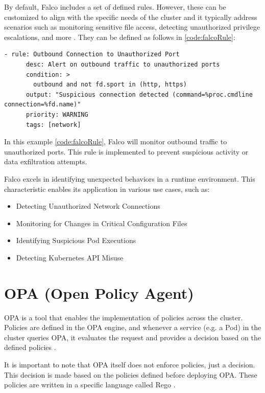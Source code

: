 \documentclass[a4paper,11pt,openright,BCOR=15mm]{scrbook}
\begin{document}
By default, Falco includes a set of defined rules. However, these can be customized to align with the specific needs of the cluster and it typically address scenarios such as monitoring sensitive file access, detecting unauthorized privilege escalations, and more \cite{benhassan_advanced_2024}. They can be defined as follows in \ref{code:falcoRule}:

\begin{lstlisting}[style=yaml,caption={Falco rule example},label=code:falcoRule]
	- rule: Outbound Connection to Unauthorized Port
	  desc: Alert on outbound traffic to unauthorized ports
	  condition: >
		outbound and not fd.sport in (http, https)
	  output: "Suspicious connection detected (command=%proc.cmdline connection=%fd.name)"
	  priority: WARNING
	  tags: [network]
\end{lstlisting}

In this example \ref{code:falcoRule}, Falco will monitor outbound traffic to unauthorized ports. This rule is implemented to prevent suspicious activity or data exfiltration attempts.

Falco excels in identifying unexpected behaviors in a runtime environment. This characteristic enables its application in various use cases, such as:

\begin{itemize}
	\item Detecting Unauthorized Network Connections
	\item Monitoring for Changes in Critical Configuration Files
	\item Identifying Suspicious Pod Executions
	\item Detecting Kubernetes API Misuse
\end{itemize}

\section{OPA (Open Policy Agent)}\label{sect:complmentRbac}

OPA is a tool that enables the implementation of policies across the cluster. Policies are defined in the OPA engine, and whenever a service (e.g. a Pod) in the cluster queries OPA, it evaluates the request and provides a decision based on the defined policies \cite{bruner_better_2020}.

It is important to note that OPA itself does not enforce policies, just a decision. This decision is made based on the policies defined before deploying OPA. These policies are written in a specific language called Rego \cite{barua_securing_2023}.
\end{document}
